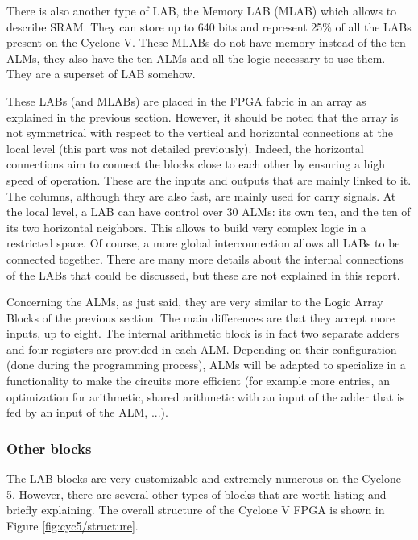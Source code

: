 There is also another type of LAB, the Memory LAB (MLAB) which allows to describe SRAM. They can 
store up to 640 bits and represent 25\% of all the LABs present on the Cyclone V. These MLABs do not 
have memory instead of the ten ALMs, they also have the ten ALMs and all the logic necessary 
to use them. They are a superset of LAB somehow.

These LABs (and MLABs) are placed in the FPGA fabric in an array as explained in the previous 
section. However, it should be noted that the array is not symmetrical with respect 
to the vertical and horizontal connections at the local level (this part was not detailed 
previously). Indeed, the horizontal connections aim to connect the blocks close to each other by 
ensuring a high speed of operation. These are the inputs and outputs that are mainly linked to it. 
The columns, although they are also fast, are mainly used for carry signals. At the local level, a 
LAB can have control over 30 ALMs: its own ten, and the ten of its two horizontal neighbors. This
allows to build very complex logic in a restricted space. Of course, a more global interconnection 
allows all LABs to be connected together. There are many more details about the internal 
connections of the LABs that could be discussed, but these are not explained in this report.

Concerning the ALMs, as just said, they are very similar to the Logic Array Blocks of 
the previous section. The main differences are that they accept more inputs, up to eight. The 
internal arithmetic block is in fact two separate adders and four registers are provided in each ALM. 
Depending on their configuration (done during the programming process), ALMs will be adapted to 
specialize in a functionality to make the circuits more efficient (for example more entries, an 
optimization for arithmetic, shared arithmetic with an input of the adder that is fed by an input 
of the ALM, ...). 

\subsubsection*{Other blocks}

The LAB blocks are very customizable and extremely numerous on the Cyclone 5. However, there are 
several other types of blocks that are worth listing and briefly explaining. The overall structure 
of the Cyclone V FPGA is shown in Figure \ref{fig:cyc5/structure}.

